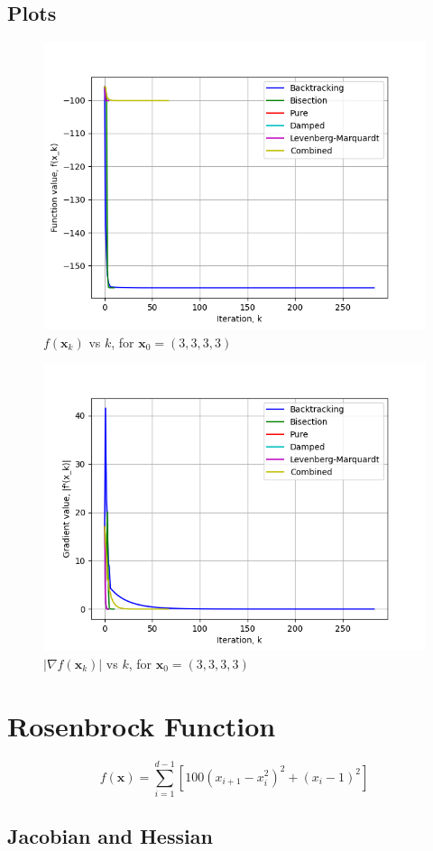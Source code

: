 \documentclass[a4paper]{article}
\begin{document}
\subsection{Plots}

\begin{figure}[H]
      \centering
      \includegraphics[width=.65\textwidth]{images/styblinski_tang_function_vals.png}
      \caption{$f(\textbf{x}_k)$ vs $k$, for $\textbf{x}_0 = (3, 3, 3, 3)$}
\end{figure}

\begin{figure}[H]
    \centering
    \includegraphics[width=.65\textwidth]{images/styblinski_tang_function_grad.png}
    \caption{$|\nabla f(\textbf{x}_k)|$ vs $k$, for $\textbf{x}_0 = (3, 3, 3, 3)$}
\end{figure}

\section{Rosenbrock Function}

$$f(\textbf{x}) = \sum_{i=1}^{d-1} [ 100(x_{i+1} - x_i^2)^2 + (x_i - 1)^2 ]$$

\subsection{Jacobian and Hessian}
\end{document}
